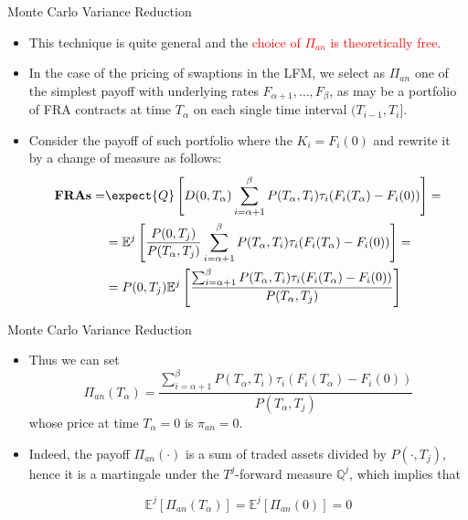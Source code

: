 \documentclass{beamer}
\begin{document}
\begin{frame}{Monte Carlo Variance Reduction}
  \begin{itemize}
  \item<1-> This technique is quite general and the \textcolor{red}{choice of $\Pi_{an}$ is theoretically free}.
  \item<2-> In the case of the pricing of swaptions in the LFM, we select as $\Pi_{an}$ one of the simplest payoff with underlying rates $F_{\alpha+1},\ldots,F_\beta$, as may be a portfolio of FRA contracts at time $T_\alpha$ on each single time interval $(T_{i-1}, T_i]$.
  \item<3-> Consider the payoff of such portfolio where the $K_i = F_i(0)$ and rewrite it by a change of measure as follows:
    \begin{equation*}
      \begin{aligned}
        \textbf{FRAs} = &\expect{Q}\left[D(0,T_\alpha)\sum_{i=\alpha+1}^\beta P(T_\alpha,T_i)\tau_i(F_i(T_\alpha) - F_i(0))\right] = \\
        &=\mathbb{E}^j\left[\frac{P(0,T_j)}{P(T_\alpha,T_j)}\sum_{i=\alpha+1}^\beta P(T_\alpha,T_i)\tau_i(F_i(T_\alpha) - F_i(0))\right] = \\
        & = P(0,T_j)\mathbb{E}^j\left[\frac{\sum_{i=\alpha+1}^\beta P(T_\alpha,T_i)\tau_i(F_i(T_\alpha) - F_i(0))}{P(T_\alpha,T_j)}\right]
      \end{aligned}
    \end{equation*}
  \end{itemize}
\end{frame}

\begin{frame}{Monte Carlo Variance Reduction}
  \begin{itemize}
  \item<1-> Thus we can set
    \begin{equation*}
      \Pi_{an}(T_\alpha) = \frac{\sum_{i=\alpha+1}^\beta P(T_\alpha,T_i)\tau_i(F_i(T_\alpha) - F_i(0))}{P(T_\alpha,T_j)}
    \end{equation*}
    whose price at time $T_\alpha = 0$ is $\pi_{an} = 0$.
  \item<2-> Indeed, the payoff $\Pi_{an}(\cdot)$ is a sum of traded assets divided by $P(\cdot, T_j)$, hence it is a martingale under the $T^j$-forward measure $\mathbb{Q}^j$, which implies that
    
    \begin{equation*}
      \mathbb{E}^j[\Pi_{an}(T_\alpha)] = \mathbb{E}^j[\Pi_{an}(0)] = 0
    \end{equation*}
  \end{itemize}
\pause
{}
\end{frame}
\end{document}
